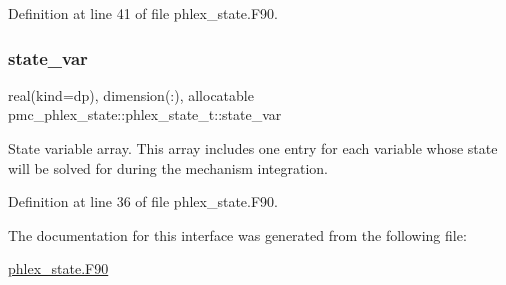 Definition at line 41 of file phlex\+\_\+state.\+F90.

\mbox{\label{structpmc__phlex__state_1_1phlex__state__t_a78835cb552d483ebbfc7a6bc6f756918}} 
\subsubsection{\texorpdfstring{state\+\_\+var}{state\_var}}
{\footnotesize\ttfamily real(kind=dp), dimension(\+:), allocatable pmc\+\_\+phlex\+\_\+state\+::phlex\+\_\+state\+\_\+t\+::state\+\_\+var\hspace{0.3cm}{\ttfamily [private]}}



State variable array. This array includes one entry for each variable whose state will be solved for during the mechanism integration. 



Definition at line 36 of file phlex\+\_\+state.\+F90.



The documentation for this interface was generated from the following file\+:\begin{DoxyCompactItemize}
\item 
\mbox{\hyperlink{phlex__state_8_f90}{phlex\+\_\+state.\+F90}}\end{DoxyCompactItemize}
